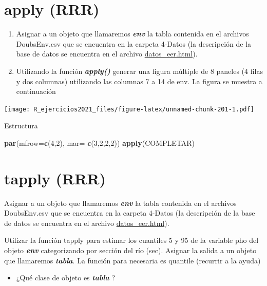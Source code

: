 \documentclass[]{book}
\newenvironment{Shaded}{\begin{snugshade}}{\end{snugshade}}
\newcommand{\DataTypeTok}[1]{\textcolor[rgb]{0.13,0.29,0.53}{#1}}
\newcommand{\DecValTok}[1]{\textcolor[rgb]{0.00,0.00,0.81}{#1}}
\newcommand{\KeywordTok}[1]{\textcolor[rgb]{0.13,0.29,0.53}{\textbf{#1}}}
\newcommand{\NormalTok}[1]{#1}
\providecommand{\tightlist}{%
  \setlength{\itemsep}{0pt}\setlength{\parskip}{0pt}}
\begin{document}
\hypertarget{apply-rrr}{%
\section{apply (RRR)}\label{apply-rrr}}

\begin{enumerate}
\def\labelenumi{\arabic{enumi}.}
\item
  Asignar a un objeto que llamaremos \textbf{\emph{env}} la tabla contenida en el archivos DoubsEnv.csv que se encuentra en la carpeta 4-Datos (la descripción de la base de datos se encuentra en el archivo \url{datos_eer.html}).
\item
  Utilizando la función \textbf{\emph{apply()}} generar una figura múltiple de 8 paneles (4 filas y dos columnas) utilizando las columnas 7 a 14 de env. La figura se muestra a continuación
\end{enumerate}

\texttt{[image: R\_ejercicios2021\_files/figure-latex/unnamed-chunk-201-1.pdf]}

Estructura

\begin{Shaded}
\begin{Highlighting}[]
\KeywordTok{par}\NormalTok{(}\DataTypeTok{mfrow=}\KeywordTok{c}\NormalTok{(}\DecValTok{4}\NormalTok{,}\DecValTok{2}\NormalTok{), }\DataTypeTok{mar=} \KeywordTok{c}\NormalTok{(}\DecValTok{3}\NormalTok{,}\DecValTok{2}\NormalTok{,}\DecValTok{2}\NormalTok{,}\DecValTok{2}\NormalTok{))}
\KeywordTok{apply}\NormalTok{(COMPLETAR)}
\end{Highlighting}
\end{Shaded}

\hypertarget{tapply-rrr}{%
\section{tapply (RRR)}\label{tapply-rrr}}

Asignar a un objeto que llamaremos \textbf{\emph{env}} la tabla contenida en el archivos DoubsEnv.csv que se encuentra en la carpeta 4-Datos (la descripción de la base de datos se encuentra en el archivo \url{datos_eer.html}).

Utilizar la función tapply para estimar los cuantiles 5 y 95 de la variable pho del objeto \textbf{\emph{env}} categorizando por sección del río (sec). Asignar la salida a un objeto que llamaremos \textbf{\emph{tabla}}. La función para necesaria es quantile (recurrir a la ayuda)

\begin{itemize}
\tightlist
\item
  ¿Qué clase de objeto es \textbf{\emph{tabla}} ?
\end{itemize}
\end{document}
